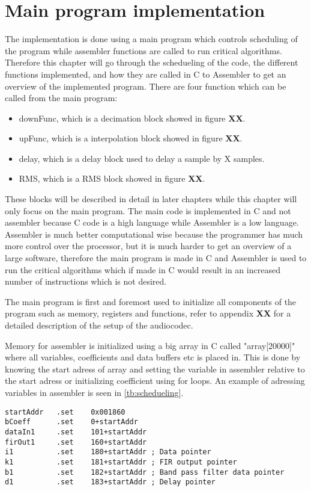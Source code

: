 \chapter{Main program implementation}
The implementation is done using a main program which controls scheduling of the program while assembler functions are called to run critical algorithms. Therefore this chapter will go through the schedueling of the code, the different functions implemented, and how they are called in C to Assembler to get an overview of the implemented program. There are four function which can be called from the main program:
\begin{itemize}
\item downFunc, which is a decimation block showed in figure \textbf{XX}.
\item upFunc, which is a interpolation block showed in figure \textbf{XX}.
\item delay, which is a delay block used to delay a sample by X samples.
\item RMS, which is a RMS block showed in figure \textbf{XX}. 
\end{itemize}
These blocks will be described in detail in later chapters while this chapter will only focus on the main program. The main code is implemented in C and not assembler because C code is a high language while Assembler is a low language. Assembler is much better computational wise because the programmer has much more control over the processor, but it is much harder to get an overview of a large software, therefore the main program is made in C and Assembler is used to run the critical algorithms which if made in C would result in an increased number of instructions which is not desired. 

The main program is first and foremost used to initialize all components of the program such as memory, registers and functions, refer to appendix \textbf{XX} for a detailed description of the setup of the audiocodec. 

Memory for assembler is initialized using a big array in C called "array[20000]" where all variables, coefficients and data buffers etc is placed in. This is done by knowing the start adress of array and setting the variable in assembler relative to the start adress or initializing coefficient using for loops. An example of adressing variables in assembler is seen in \autoref{tb:schedueling}.

\begin{lstlisting}[language={[x86masm]Assembler}, caption = {Adressing assembler},label={listingAdressing}]
startAddr	.set	0x001860
bCoeff		.set	0+startAddr
dataIn1		.set	101+startAddr
firOut1		.set	160+startAddr
i1			.set	180+startAddr ; Data pointer
k1			.set	181+startAddr ; FIR output pointer
b1			.set	182+startAddr ; Band pass filter data pointer
d1			.set	183+startAddr ; Delay pointer
\end{lstlisting}

